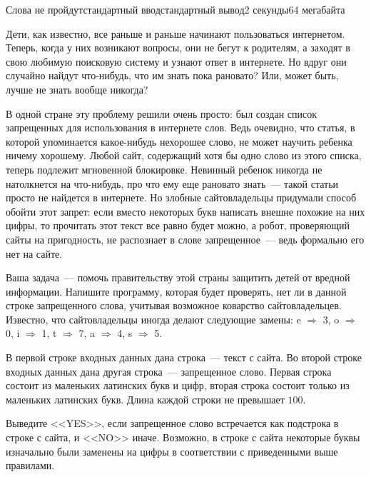\begin{problem}{Слова не пройдут}{стандартный ввод}{стандартный вывод}{2 секунды}{64 мегабайта}

Дети, как известно, все раньше и раньше начинают пользоваться интернетом. Теперь, когда у них возникают вопросы, они не бегут к родителям, а заходят в свою любимую поисковую систему и узнают ответ в интернете. Но вдруг они случайно найдут что-нибудь, что им знать пока рановато? Или, может быть, лучше не знать вообще никогда?

В одной стране эту проблему решили очень просто: был создан список запрещенных для использования в интернете слов. Ведь очевидно, что статья, в которой упоминается какое-нибудь нехорошее слово, не может научить ребенка ничему хорошему. Любой сайт, содержащий хотя бы одно слово из этого списка, теперь подлежит мгновенной блокировке. Невинный ребенок никогда не натолкнется на что-нибудь, про что ему еще рановато знать~--- такой статьи просто не найдется в интернете. Но злобные сайтовладельцы придумали способ обойти этот запрет: если вместо некоторых букв написать внешне похожие на них цифры, то прочитать этот текст все равно будет можно, а робот, проверяющий сайты на пригодность, не распознает в слове запрещенное~--- ведь формально его нет на сайте.

Ваша задача~--- помочь правительству этой страны защитить детей от вредной информации. Напишите программу, которая будет проверять, нет ли в данной строке запрещенного слова, учитывая возможное коварство сайтовладельцев. Известно, что сайтовладельцы иногда делают следующие замены: 
e $\Rightarrow$ 3, 
o $\Rightarrow$ 0,
i $\Rightarrow$ 1,
t $\Rightarrow$ 7,
a $\Rightarrow$ 4,
s $\Rightarrow$ 5.

\InputFile
В первой строке входных данных дана строка~--- текст с сайта. Во второй строке входных данных дана другая строка~--- запрещенное слово. Первая строка состоит из маленьких латинских букв и цифр, вторая строка состоит только из маленьких латинских букв. Длина каждой строки не превышает $100$.


\OutputFile
Выведите <<YES>>, если запрещенное слово встречается как подстрока в строке с сайта, и <<NO>> иначе. Возможно, в строке с сайта некоторые буквы изначально были заменены на цифры в соответствии с приведенными выше правилами. 

\Examples

\begin{example}
%
%
%
%
\end{example}

\end{problem}
